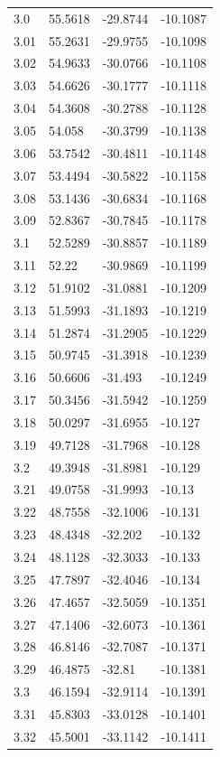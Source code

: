\begin{tabular}{llll}
3.0 & 55.5618 & -29.8744 & -10.1087 \\
3.01 & 55.2631 & -29.9755 & -10.1098 \\
3.02 & 54.9633 & -30.0766 & -10.1108 \\
3.03 & 54.6626 & -30.1777 & -10.1118 \\
3.04 & 54.3608 & -30.2788 & -10.1128 \\
3.05 & 54.058 & -30.3799 & -10.1138 \\
3.06 & 53.7542 & -30.4811 & -10.1148 \\
3.07 & 53.4494 & -30.5822 & -10.1158 \\
3.08 & 53.1436 & -30.6834 & -10.1168 \\
3.09 & 52.8367 & -30.7845 & -10.1178 \\
3.1 & 52.5289 & -30.8857 & -10.1189 \\
3.11 & 52.22 & -30.9869 & -10.1199 \\
3.12 & 51.9102 & -31.0881 & -10.1209 \\
3.13 & 51.5993 & -31.1893 & -10.1219 \\
3.14 & 51.2874 & -31.2905 & -10.1229 \\
3.15 & 50.9745 & -31.3918 & -10.1239 \\
3.16 & 50.6606 & -31.493 & -10.1249 \\
3.17 & 50.3456 & -31.5942 & -10.1259 \\
3.18 & 50.0297 & -31.6955 & -10.127 \\
3.19 & 49.7128 & -31.7968 & -10.128 \\
3.2 & 49.3948 & -31.8981 & -10.129 \\
3.21 & 49.0758 & -31.9993 & -10.13 \\
3.22 & 48.7558 & -32.1006 & -10.131 \\
3.23 & 48.4348 & -32.202 & -10.132 \\
3.24 & 48.1128 & -32.3033 & -10.133 \\
3.25 & 47.7897 & -32.4046 & -10.134 \\
3.26 & 47.4657 & -32.5059 & -10.1351 \\
3.27 & 47.1406 & -32.6073 & -10.1361 \\
3.28 & 46.8146 & -32.7087 & -10.1371 \\
3.29 & 46.4875 & -32.81 & -10.1381 \\
3.3 & 46.1594 & -32.9114 & -10.1391 \\
3.31 & 45.8303 & -33.0128 & -10.1401 \\
3.32 & 45.5001 & -33.1142 & -10.1411 \\

\end{tabular}
